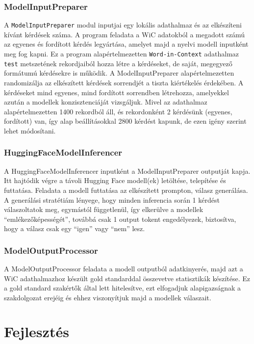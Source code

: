 \documentclass[12pt]{report}
\begin{document}
    \subsubsection{ModelInputPreparer}
    A \texttt{\allowbreak ModelInputPreparer} modul inputjai egy lokális adathalmaz és az elkészíteni kívánt kérdések száma.
    A program feladata a WiC adatokból a megadott számú az egyenes és fordított kérdés legyártása, amelyet majd a nyelvi modell inputként meg fog kapni.
    Ez a program alapértelmezetten \texttt{\allowbreak Word-in-Context} adathalmaz \texttt{\allowbreak test} metszetének rekordjaiból hozza létre a kérdéseket, de saját, megegyező formátumú kérdésekre is működik. A ModelInputPreparer alapértelmezetten randomizálja az elkészített kérdések sorrendjét a tiszta kiértékelés érdekében. A kérdéseket mind egyenes, mind fordított sorrendben létrehozza, amelyekkel azután a modellek konzisztenciáját vizsgáljuk. Mivel az adathalmaz alapértelmezetten 1400 rekordból áll, és rekordonként 2 kérdésünk (egyenes, fordított) van, így alap beállításokkal 2800 kérdést kapunk, de ezen igény szerint lehet módosítani.

    \subsubsection{HuggingFaceModelInferencer}\label{subsubsec:huggingfacemodelinferencer}
    A HuggingFaceModelInferencer inputként a ModelInputPreparer outputját kapja.
    Itt hajtódik végre a távoli Hugging Face modell(ek) letöltése, telepítése és futtatása.
    Feladata a modell futtatása az elkészített prompton, válasz generálása.
    A generálási stratétiám lényege, hogy minden inferencia során 1 kérdést válaszoltatok meg, egymástól függetlenül, így elkerülve a modellek ``emlékezőképességét'', továbbá csak 1 output tokent engedélyezek, biztosítva, hogy a válasz csak egy ``igen'' vagy ``nem'' lesz.

    \subsubsection{ModelOutputProcessor}
    A ModelOutputProcessor feladata a modell outputból adatkinyerés, majd azt a WiC adathalmazhoz készült gold standarddal összevetve statisztikák készítése.
    Ez a gold standard szakértők által lett hitelesítve, ezt elfogadjuk alapigazságnak a szakdolgozat erejéig és ehhez viszonyítjuk majd a modellek válaszait.


    \section{Fejlesztés}
\end{document}

